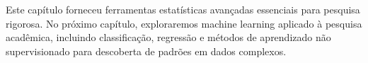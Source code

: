 Este capítulo forneceu ferramentas estatísticas avançadas essenciais para pesquisa rigorosa. No próximo capítulo, exploraremos machine learning aplicado à pesquisa acadêmica, incluindo classificação, regressão e métodos de aprendizado não supervisionado para descoberta de padrões em dados complexos.